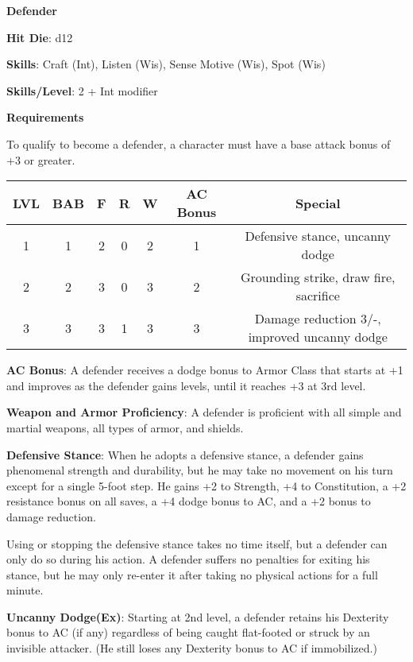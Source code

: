 \textbf{\huge{Defender}}

\textbf{Hit Die}: d12

\textbf{Skills}: Craft (Int), Listen (Wis), Sense Motive (Wis), Spot (Wis)

\textbf{Skills/Level}: 2 + Int modifier

\textbf{\large{Requirements}}

To qualify to become a defender, a character must have a base attack bonus of +3 or greater.

\begin{center}
\begin{adjustwidth}{-4cm}{}
\begin{small}
\begin{tabular}{| c | c | c | c | c | c | c |}
\hline
LVL &BAB &F &R &W &AC Bonus &Special \\
\hline
1 &1 &2 &0 &2 &1 &Defensive stance, uncanny dodge \\
2 &2 &3 &0 &3 &2 &Grounding strike, draw fire, sacrifice \\
3 &3 &3 &1 &3 &3 &Damage reduction 3/-, improved uncanny dodge \\
\hline
\end{tabular}
\end{small}
\end{adjustwidth}
\end{center}

\textbf{AC Bonus}: A defender receives a dodge bonus to Armor Class that starts at +1 and improves as the defender gains levels, until it reaches +3 at 3rd level.

\textbf{Weapon and Armor Proficiency}: A defender is proficient with all simple and martial weapons, all types of armor, and shields.

\textbf{Defensive Stance}: When he adopts a defensive stance, a defender gains phenomenal strength and durability, but he may take no movement on his turn except for a single 5-foot step. He gains +2 to Strength, +4 to Constitution, a +2 resistance bonus on all saves, a +4 dodge bonus to AC, and a +2 bonus to damage reduction.

Using or stopping the defensive stance takes no time itself, but a defender can only do so during his action. A defender suffers no penalties for exiting his stance, but he may only re-enter it after taking no physical actions for a full minute.

\textbf{Uncanny Dodge(Ex)}: Starting at 2nd level, a defender retains his Dexterity bonus to AC (if any) regardless of being caught flat-footed or struck by an invisible attacker. (He still loses any Dexterity bonus to AC if immobilized.)

